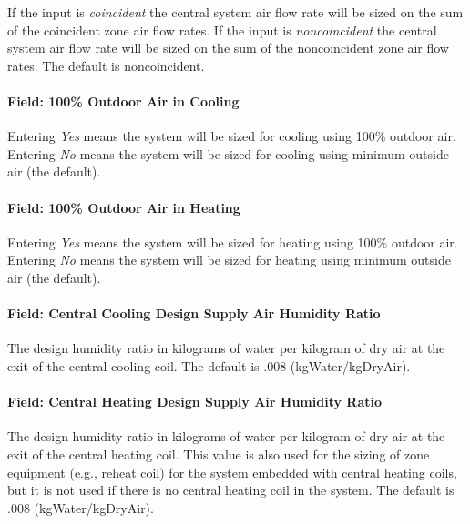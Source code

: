 If the input is \emph{coincident} the central system air flow rate will be sized on the sum of the coincident zone air flow rates. If the input is \emph{noncoincident} the central system air flow rate will be sized on the sum of the noncoincident zone air flow rates. The default is noncoincident.

\paragraph{Field: 100\% Outdoor Air in Cooling}\label{field-100-outdoor-air-in-cooling}

Entering \emph{Yes} means the system will be sized for cooling using 100\% outdoor air. Entering \emph{No} means the system will be sized for cooling using minimum outside air (the default).

\paragraph{Field: 100\% Outdoor Air in Heating}\label{field-100-outdoor-air-in-heating}

Entering \emph{Yes} means the system will be sized for heating using 100\% outdoor air. Entering \emph{No} means the system will be sized for heating using minimum outside air (the default).

\paragraph{Field: Central Cooling Design Supply Air Humidity Ratio}\label{field-central-cooling-design-supply-air-humidity-ratio}

The design humidity ratio in kilograms of water per kilogram of dry air at the exit of the central cooling coil. The default is .008 (kgWater/kgDryAir).

\paragraph{Field: Central Heating Design Supply Air Humidity Ratio}\label{field-central-heating-design-supply-air-humidity-ratio}

The design humidity ratio in kilograms of water per kilogram of dry air at the exit of the central heating coil. This value is also used for the sizing of zone equipment (e.g., reheat coil) for the system embedded with central heating coils, but it is not used if there is no central heating coil in the system. The default is .008 (kgWater/kgDryAir).


